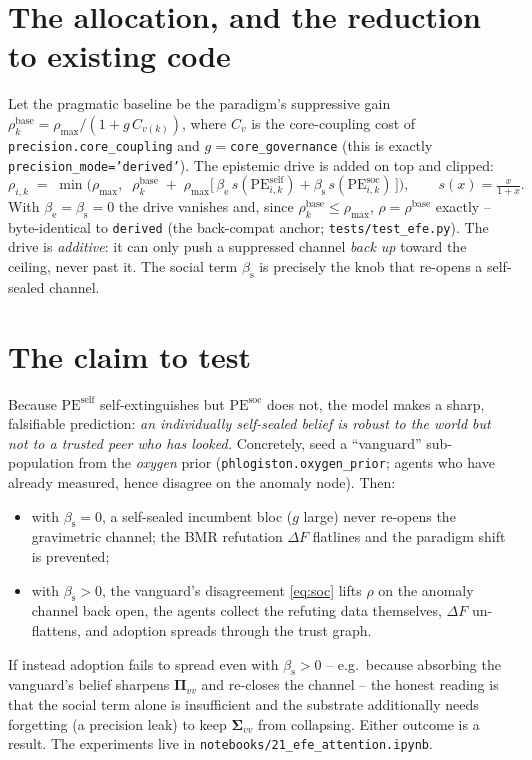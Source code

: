 \documentclass[11pt]{article}
\newcommand{\Pib}{\boldsymbol{\Pi}}
\newcommand{\Sib}{\boldsymbol{\Sigma}}
\begin{document}
\section{The allocation, and the reduction to existing code}
Let the pragmatic baseline be the paradigm's suppressive gain
$\rho^{\mathrm{base}}_k=\rho_{\max}/(1+g\,C_{v(k)})$, where $C_v$ is the core-coupling cost of
\texttt{precision.core\_coupling} and $g=$\texttt{core\_governance} (this is exactly
\texttt{precision\_mode='derived'}). The epistemic drive is added on top and clipped:
\begin{equation}
\rho_{i,k}\;=\;\min\!\Big(\rho_{\max},\;\;\rho^{\mathrm{base}}_k
\;+\;\rho_{\max}\big[\,\beta_{\mathrm e}\,s(\mathrm{PE}^{\mathrm{self}}_{i,k})
+\beta_{\mathrm s}\,s(\mathrm{PE}^{\mathrm{soc}}_{i,k})\,\big]\Big),
\qquad s(x)=\tfrac{x}{1+x}.
\label{eq:rho}
\end{equation}
With $\beta_{\mathrm e}=\beta_{\mathrm s}=0$ the drive vanishes and, since
$\rho^{\mathrm{base}}_k\le\rho_{\max}$, $\rho=\rho^{\mathrm{base}}$ exactly -- byte-identical to
\texttt{derived} (the back-compat anchor; \texttt{tests/test\_efe.py}). The drive is
\emph{additive}: it can only push a suppressed channel \emph{back up} toward the ceiling, never
past it. The social term $\beta_{\mathrm s}$ is precisely the knob that re-opens a self-sealed
channel.

\section{The claim to test}
Because $\mathrm{PE}^{\mathrm{self}}$ self-extinguishes but $\mathrm{PE}^{\mathrm{soc}}$ does not,
the model makes a sharp, falsifiable prediction: \emph{an individually self-sealed belief is
robust to the world but not to a trusted peer who has looked.} Concretely, seed a ``vanguard''
sub-population from the \emph{oxygen} prior (\texttt{phlogiston.oxygen\_prior}; agents who have
already measured, hence disagree on the anomaly node). Then:
\begin{itemize}
\item with $\beta_{\mathrm s}=0$, a self-sealed incumbent bloc ($g$ large) never re-opens the
gravimetric channel; the BMR refutation $\Delta F$ flatlines and the paradigm shift is prevented;
\item with $\beta_{\mathrm s}>0$, the vanguard's disagreement \eqref{eq:soc} lifts $\rho$ on the
anomaly channel back open, the agents collect the refuting data themselves, $\Delta F$
un-flattens, and adoption spreads through the trust graph.
\end{itemize}
If instead adoption fails to spread even with $\beta_{\mathrm s}>0$ -- e.g.\ because absorbing the
vanguard's belief sharpens $\Pib_{vv}$ and re-closes the channel -- the honest reading is that the
social term alone is insufficient and the substrate additionally needs forgetting (a precision
leak) to keep $\Sib_{vv}$ from collapsing. Either outcome is a result. The experiments live in
\texttt{notebooks/21\_efe\_attention.ipynb}.
\end{document}
